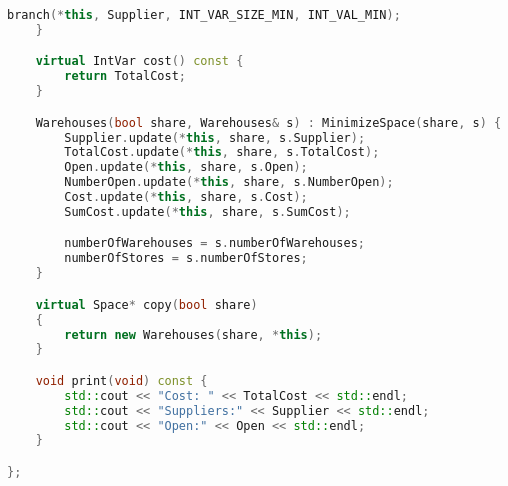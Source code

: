 \begin{lstlisting}[language=C++]
		branch(*this, Supplier, INT_VAR_SIZE_MIN, INT_VAL_MIN);
	}

	virtual IntVar cost() const {
		return TotalCost;
	}

	Warehouses(bool share, Warehouses& s) : MinimizeSpace(share, s) {
		Supplier.update(*this, share, s.Supplier);
		TotalCost.update(*this, share, s.TotalCost);
		Open.update(*this, share, s.Open);
		NumberOpen.update(*this, share, s.NumberOpen);
		Cost.update(*this, share, s.Cost);
		SumCost.update(*this, share, s.SumCost);

		numberOfWarehouses = s.numberOfWarehouses;
		numberOfStores = s.numberOfStores;
	}

	virtual Space* copy(bool share)
	{
		return new Warehouses(share, *this);
	}

	void print(void) const {
		std::cout << "Cost: " << TotalCost << std::endl;
		std::cout << "Suppliers:" << Supplier << std::endl;
		std::cout << "Open:" << Open << std::endl;
	}

};
\end{lstlisting}